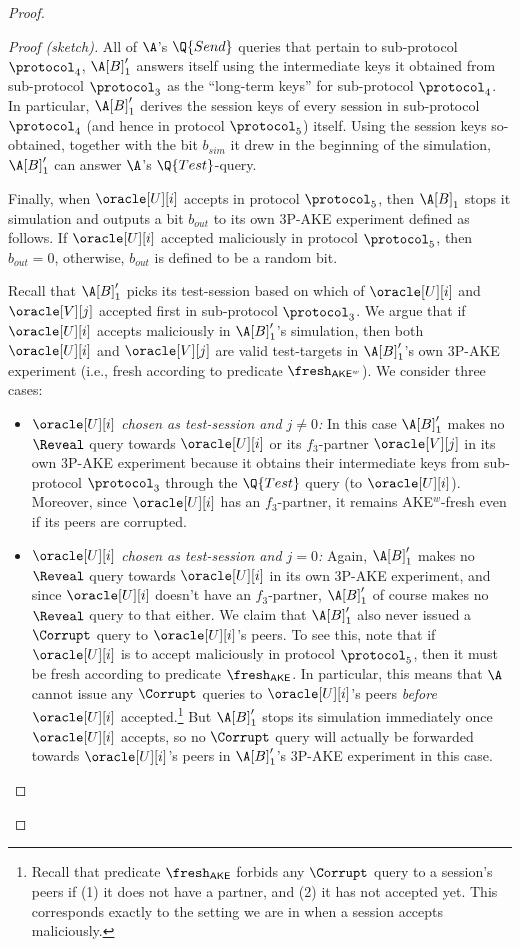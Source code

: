 \begin{proof}
\begin{proof}[Proof (sketch)]
All of $\A$'s $\Q{Send}$ queries that pertain to sub-protocol $\protocol_4$,
$\A[B]'_1$ answers itself using the intermediate keys it obtained from sub-protocol $\protocol_3$ as the ``long-term keys'' for sub-protocol $\protocol_4$.
In particular,
$\A[B]'_1$ derives the session keys of every session in sub-protocol $\protocol_4$ 
(and hence in protocol $\protocol_5$) itself.
Using the session keys so-obtained,
together with the bit $b_{sim}$ it drew in the beginning of the simulation,
$\A[B]'_1$ can answer $\A$'s $\Q{Test}$-query.




Finally, 
when $\oracle[U][i]$ accepts in protocol $\protocol_5$,
then $\A[B]_1$ stops it simulation and outputs a bit $b_{out}$ to its own 3P-AKE experiment defined as follows.
If $\oracle[U][i]$ accepted maliciously in protocol $\protocol_5$,
then $b_{out} = 0$,
otherwise, $b_{out}$ is defined to be a random bit.
\medskip

Recall that $\A[B]'_1$ picks its test-session based on which of $\oracle[U][i]$ and $\oracle[V][j]$ accepted first in sub-protocol $\protocol_3$.
We argue that if $\oracle[U][i]$ accepts maliciously in $\A[B]'_1$'s simulation,
then both $\oracle[U][i]$ and $\oracle[V][j]$ are valid  test-targets in $\A[B]'_1$'s own 3P-AKE experiment
(i.e., fresh according to predicate $\fresh_{\mathsf{AKE}^w}$).
We consider three cases: 

\begin{itemize}
	\item \emph{$\oracle[U][i]$ chosen as test-session and $j \neq 0$:}  
	In this case $\A[B]'_1$ makes no $\Reveal$ query towards $\oracle[U][i]$
	or its $f_3$-partner $\oracle[V][j]$
	in its own 3P-AKE experiment
	because it obtains their intermediate keys from sub-protocol $\protocol_3$ through the $\Q{Test}$ query (to $\oracle[U][i]$).
	Moreover,
	since $\oracle[U][i]$ has an $f_3$-partner,
	it remains AKE$^w$-fresh even if its peers are corrupted.
	
	\item \emph{$\oracle[U][i]$ chosen as test-session and $j = 0$:}  
	Again, $\A[B]'_1$ makes no $\Reveal$ query towards $\oracle[U][i]$ in its own 3P-AKE experiment,
	and since $\oracle[U][i]$ doesn't have an $f_3$-partner,
	$\A[B]'_1$ of course makes no $\Reveal$ query to that either.
	We claim that $\A[B]'_1$ also never issued a $\Corrupt$ query to $\oracle[U][i]$'s peers.
	To see this,
	note that if $\oracle[U][i]$ is to accept maliciously in protocol $\protocol_5$,
	then it must be fresh according to predicate $\fresh_{\mathsf{AKE}}$.
	In particular,
	this means that $\A$ cannot issue any $\Corrupt$ queries to $\oracle[U][i]$'s peers \emph{before} $\oracle[U][i]$ accepted.\footnote{Recall 
	that predicate $\fresh_{\mathsf{AKE}}$ forbids any $\Corrupt$ query to a session's peers if (1) it does not have a partner, and (2) it has not accepted yet. 
	This corresponds exactly to the setting we are in when a session accepts maliciously.}  
	But
	$\A[B]'_1$ stops its simulation immediately once $\oracle[U][i]$ accepts,
	so no $\Corrupt$ query will actually be forwarded towards $\oracle[U][i]$'s peers  in $\A[B]'_1$'s 3P-AKE experiment in this case.


\end{itemize}
\end{proof}
\end{proof}
